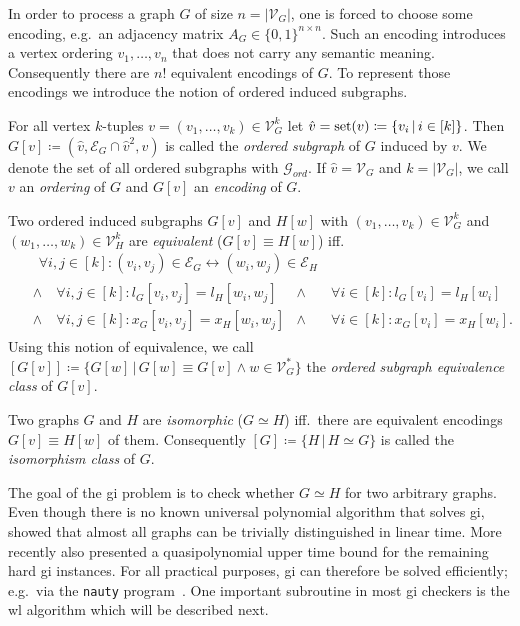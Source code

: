 In order to process a graph $G$ of size $n = |\mathcal{V}_G|$, one is forced to choose some encoding, e.g.\ an adjacency matrix $A_G \in {\{0, 1\}}^{n \times n}$.
Such an encoding introduces a vertex ordering $v_1, \dots, v_n$ that does not carry any semantic meaning.
Consequently there are $n!$ equivalent encodings of $G$. %
To represent those encodings we introduce the notion of ordered induced subgraphs.
\begin{defn}\label{defn:related:ordered-subgraph}
	For all vertex $k$-tuples $v = (v_1, \dots, v_k) \in \mathcal{V}_G^k$ let $\hat{v} = \operatorname{set}(v) \coloneqq \{ v_i\, |\, i \in [k] \}$.
	Then $G[v] \coloneqq (\hat{v}, \mathcal{E}_G \cap \hat{v}^2, v)$ is called the \textit{ordered subgraph} of $G$ induced by $v$.
	We denote the set of all ordered subgraphs with $\mathcal{G}_{\mathit{ord}}$.
	If $\hat{v} = \mathcal{V}_G$ and $k = |\mathcal{V}_G|$, we call $v$ an \textit{ordering} of $G$ and $G[v]$ an \textit{encoding} of $G$.
\end{defn}
\begin{defn}\label{defn:related:ordered-subgraph-equivalence}
	Two ordered induced subgraphs $G[v]$ and $H[w]$ with $(v_1, \dots, v_k) \in \mathcal{V}_G^k$ and $(w_1, \dots, w_k) \in \mathcal{V}_H^k$ are \textit{equivalent} ($G[v] \equiv H[w]$) iff.\
	\begin{align*}
		&\quad\forall i, j \in [k]: (v_i, v_j) \in \mathcal{E}_G \leftrightarrow (w_i, w_j) \in \mathcal{E}_H \\
		&\, \begin{aligned}
			\land&\ \forall i, j \in [k]: l_G[v_i, v_j] = l_H[w_i, w_j] &\land&\quad\forall i \in [k]: l_G[v_i] = l_H[w_i] \\
			\land&\ \forall i, j \in [k]: x_G[v_i, v_j] = x_H[w_i, w_j] &\land&\quad\forall i \in [k]: x_G[v_i] = x_H[w_i]\text{.}
		\end{aligned}
	\end{align*}
	Using this notion of equivalence, we call ${\left[ G[v] \right]} \coloneqq \{ G[w]\, |\, G[w] \equiv G[v] \land w \in \mathcal{V}_G^{*} \}$ the \textit{ordered subgraph equivalence class} of $G[v]$.
\end{defn}
\begin{defn}
	Two graphs $G$ and $H$ are \textit{isomorphic} ($G \simeq H$) iff.\ there are equivalent encodings $G[v] \equiv H[w]$ of them.
	Consequently $[G] \coloneqq \{ H\, |\, H \simeq G \}$ is called the \textit{isomorphism class} of $G$.
\end{defn}
The goal of the \ac{gi} problem is to check whether $G \simeq H$ for two arbitrary graphs.
Even though there is no known universal polynomial algorithm that solves \ac{gi}, \citet{Babai1980} showed that almost all graphs can be trivially distinguished in linear time.
More recently \citet{Babai2015} also presented a quasipolynomial upper time bound for the remaining hard \ac{gi} instances.
For all practical purposes, \ac{gi} can therefore be solved efficiently; e.g.\ via the \texttt{nauty} program~\cite{McKay}\cite{McKay2013}.
One important subroutine in most \ac{gi} checkers is the \acl{wl} algorithm which will be described next.

